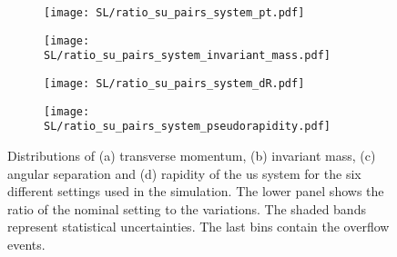 \begin{figure}[H]
    \centering
    \begin{subfigure}{0.49\textwidth}
        \centering
        \texttt{[image: SL/ratio\_su\_pairs\_system\_pt.pdf]}
        \caption{}
        \label{app:subfig:pt(su)_SL}
    \end{subfigure}
    \begin{subfigure}{0.49\textwidth}
        \centering
        \texttt{[image: SL/ratio\_su\_pairs\_system\_invariant\_mass.pdf]}
        \caption{}
        \label{app:subfig:m(su)_SL}
    \end{subfigure}

    \vspace{0.2cm}
    
    \begin{subfigure}{0.49\textwidth}
        \centering
        \texttt{[image: SL/ratio\_su\_pairs\_system\_dR.pdf]}
        \caption{}
        \label{app:subfig:dR(su)_SL}
    \end{subfigure}
    \begin{subfigure}{0.49\textwidth}
        \centering
        \texttt{[image: SL/ratio\_su\_pairs\_system\_pseudorapidity.pdf]}
        \caption{}
        \label{app:subfig:y(su)_SL}
    \end{subfigure}
    \caption{Distributions of (a) transverse momentum, (b) invariant mass,  (c) angular separation and (d) rapidity of the us  system for the six different settings used in the simulation. The lower panel shows the ratio of the nominal setting to the variations. The shaded bands represent statistical uncertainties. The last bins contain the overflow events.}
    \label{app:fig:su_SL}
\end{figure}

